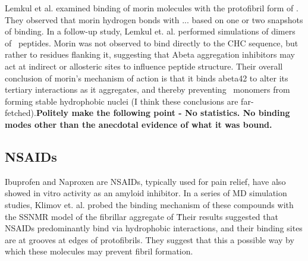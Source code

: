 Lemkul et al. examined binding of morin molecules with the protofibril form of . They observed that morin hydrogen bonds with ... based on one or two snapshots of binding. In a follow-up study, Lemkul et. al. performed simulations of dimers of \ peptides. Morin was not observed to bind directly to the CHC sequence, but rather to residues flanking it, suggesting that Abeta aggregation inhibitors may act at indirect or allosteric sites to influence peptide structure. Their overall conclusion of morin's mechanism of action is that it binds abeta42 to alter its tertiary interactions as it aggregates, and thereby preventing \ monomers from forming stable hydrophobic nuclei (I think these conclusions are far-fetched).\textbf{Politely make the following point - No statistics. No binding modes other than the anecdotal evidence of what it was bound.} 


\subsection{NSAIDs}
Ibuprofen and Naproxen are NSAIDs, typically used for pain relief, have also showed in vitro activity as an amyloid inhibitor. In a series of MD simulation studies, Klimov et. al. probed the binding mechanism of these compounds with the SSNMR model of the fibrillar aggregate of \. Their results suggested that NSAIDs predominantly bind via hydrophobic interactions, and their binding sites are at grooves at edges of protofibrils.  They suggest that this a possible way by which these molecules may prevent fibril formation.


